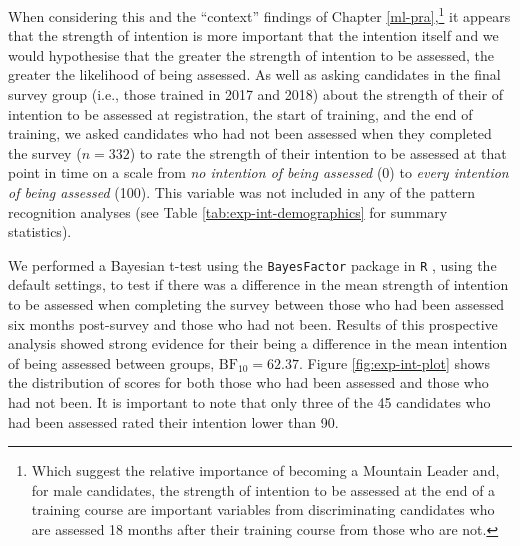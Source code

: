 \documentclass[
  12pt,
  a4paper,
]{book}
\begin{document}
When considering this and the ``context'' findings of Chapter \ref{ml-pra},\footnote{Which suggest the relative importance of becoming a Mountain Leader and, for male candidates, the strength of intention to be assessed at the end of a training course are important variables from discriminating candidates who are assessed 18 months after their training course from those who are not.} it appears that the strength of intention is more important that the intention itself and we would hypothesise that the greater the strength of intention to be assessed, the greater the likelihood of being assessed. As well as asking candidates in the final survey group (i.e., those trained in 2017 and 2018) about the strength of their of intention to be assessed at registration, the start of training, and the end of training, we asked candidates who had not been assessed when they completed the survey (\(n = 332\)) to rate the strength of their intention to be assessed at that point in time on a scale from \emph{no intention of being assessed} (0) to \emph{every intention of being assessed} (100). This variable was not included in any of the pattern recognition analyses (see Table \ref{tab:exp-int-demographics} for summary statistics).

\begin{table}

\caption{\label{tab:exp-int-demographics}Summary statistics for candidates who had not been assessed when completing the survey.}
\centering
{}
\end{table}

We performed a Bayesian t-test using the \texttt{BayesFactor} package \citep{R-BayesFactor} in \texttt{R} \citep{R-base}, using the default settings, to test if there was a difference in the mean strength of intention to be assessed when completing the survey between those who had been assessed six months post-survey and those who had not been. Results of this prospective analysis showed strong evidence for their being a difference in the mean intention of being assessed between groups, \(\mathrm{BF}_{\textrm{10}} = 62.37\). Figure \ref{fig:exp-int-plot} shows the distribution of scores for both those who had been assessed and those who had not been. It is important to note that only three of the 45 candidates who had been assessed rated their intention lower than 90.
\end{document}
